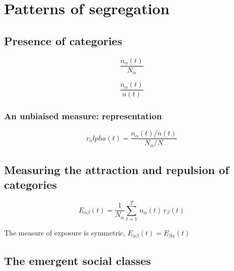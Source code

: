 %
\chapter{Patterns of segregation}
\label{sec:concepts}


\bigskip


\section{Presence of categories}
\label{sec:presence_of_categories}

\begin{equation}
    \frac{n_\alpha(t)}{N_\alpha}
\end{equation}


\begin{equation}
    \frac{n_\alpha(t)}{n(t)}
\end{equation}

\subsection{An unbiaised measure: representation}
\label{sub:an_unbiaised_measure_the_representation}

\begin{equation}
    r_alpha(t) = \frac{n_\alpha(t)/n(t)}{N_\alpha/N}
\end{equation}

\section{Measuring the attraction and repulsion of categories}
\label{sec:measuring_the_attraction_and_repulsion_of_categories}

\begin{equation}
    E_{\alpha \beta}(t) = \frac{1}{N_\alpha}
    \sum_{t=1}^T\,n_\alpha(t)\,r_\beta(t) 
\end{equation}

The measure of exposure is symmetric, $E_{\alpha \beta}(t) = E_{\beta \alpha}(t)$

\section{The emergent social classes}
\label{sec:the_emergent_social_classes}


